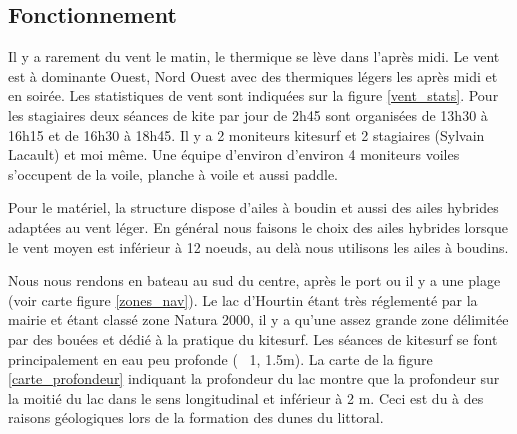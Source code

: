 \documentclass[12pt,a4paper]{report}
\begin{document}
\subsection{Fonctionnement}
Il y a rarement du vent le matin, le thermique se lève dans l'après midi.
Le vent est à dominante Ouest, Nord Ouest avec des thermiques légers les après midi et 
en soirée. Les statistiques de vent sont indiquées sur la figure \ref{vent_stats}.
Pour les stagiaires deux séances de kite par jour de 2h45 sont organisées de 13h30 à 16h15
et de 16h30 à 18h45.
Il y a 2 moniteurs kitesurf et 2 stagiaires (Sylvain Lacault) et moi m\^eme.
Une équipe d'environ d'environ 4 moniteurs voiles s'occupent de la voile, 
planche à voile et aussi paddle.

Pour le matériel, la structure dispose d'ailes à boudin et aussi des ailes 
hybrides adaptées au vent léger. En général nous faisons le choix des ailes hybrides 
lorsque le vent moyen est inférieur à 12 noeuds, au delà nous utilisons
les ailes à boudins.

Nous nous rendons en bateau au sud du centre, après le port ou il y a 
une plage (voir carte figure \ref{zones_nav}). Le lac d'Hourtin étant très 
réglementé par la mairie et étant classé zone Natura 2000\cite{natura2000}, 
il y a qu'une assez grande zone délimitée par des bouées et dédié à la pratique
du kitesurf.
Les séances de kitesurf se font principalement en eau peu profonde (~ 1, 1.5m).
La carte de la figure \ref{carte_profondeur} indiquant la profondeur du lac montre que la 
profondeur sur la moitié du lac dans le sens longitudinal 
et inférieur à 2 m. Ceci est du à des raisons géologiques lors de la
formation des dunes du littoral.
\end{document}

